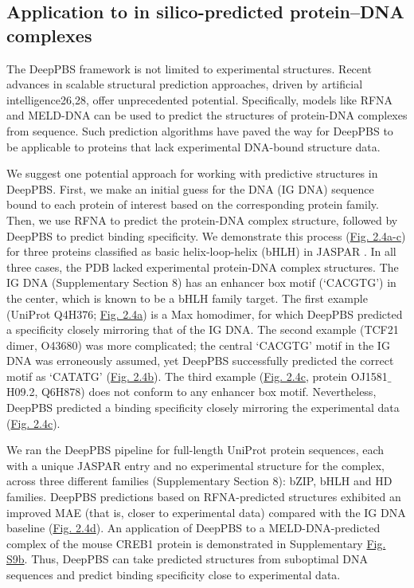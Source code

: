 \subsection{Application to in silico-predicted protein–DNA complexes}
The DeepPBS framework is not limited to experimental structures. Recent advances in scalable structural prediction approaches, driven by artificial intelligence26,28, offer unprecedented potential. Specifically, models like RFNA \citep{baek2024na} and MELD-DNA \citep{Esmaeeli2023} can be used to predict the structures of protein-DNA complexes from sequence. Such prediction algorithms have paved the way for DeepPBS to be applicable to proteins that lack experimental DNA-bound structure data.
\par
We suggest one potential approach for working with predictive structures in DeepPBS. First, we make an initial guess for the DNA (IG DNA) sequence bound to each protein of interest based on the corresponding protein family. Then, we use RFNA to predict the protein-DNA complex structure, followed by DeepPBS to predict binding specificity. We demonstrate this process (\hyperref[fig:pdna3]{Fig. 2.4a-c}) for three proteins classified as basic helix-loop-helix (bHLH) in JASPAR \citep{Jaime2022}. In all three cases, the PDB lacked experimental protein-DNA complex structures. The IG DNA (Supplementary Section 8) has an enhancer box motif (‘CACGTG’) in the center, which is known \citep{demartin2021} to be a bHLH family target. The first example (UniProt Q4H376; \hyperref[fig:pdna3]{Fig. 2.4a}) is a Max homodimer, for which DeepPBS predicted a specificity closely mirroring that of the IG DNA. The second example (TCF21 dimer, O43680) was more complicated; the central ‘CACGTG’ motif in the IG DNA was erroneously assumed, yet DeepPBS successfully predicted the correct motif as ‘CATATG’ (\hyperref[fig:pdna3]{Fig. 2.4b}). The third example (\hyperref[fig:pdna3]{Fig. 2.4c}, protein OJ1581$\_$H09.2, Q6H878) does not conform to any enhancer box motif. Nevertheless, DeepPBS predicted a binding specificity closely mirroring the experimental data (\hyperref[fig:pdna3]{Fig. 2.4c}).
\par
We ran the DeepPBS pipeline for full-length UniProt protein sequences, each with a unique JASPAR entry and no experimental structure for the complex, across three different families (Supplementary Section 8): bZIP, bHLH and HD families. DeepPBS predictions based on RFNA-predicted structures exhibited an improved MAE (that is, closer to experimental data) compared with the IG DNA baseline (\hyperref[fig:pdna3]{Fig. 2.4d}). An application of DeepPBS to a MELD-DNA-predicted complex of the mouse CREB1 protein is demonstrated in Supplementary \hyperref[fig:pdnaS9]{Fig. S9b}. Thus, DeepPBS can take predicted structures from suboptimal DNA sequences and predict binding specificity close to experimental data.
